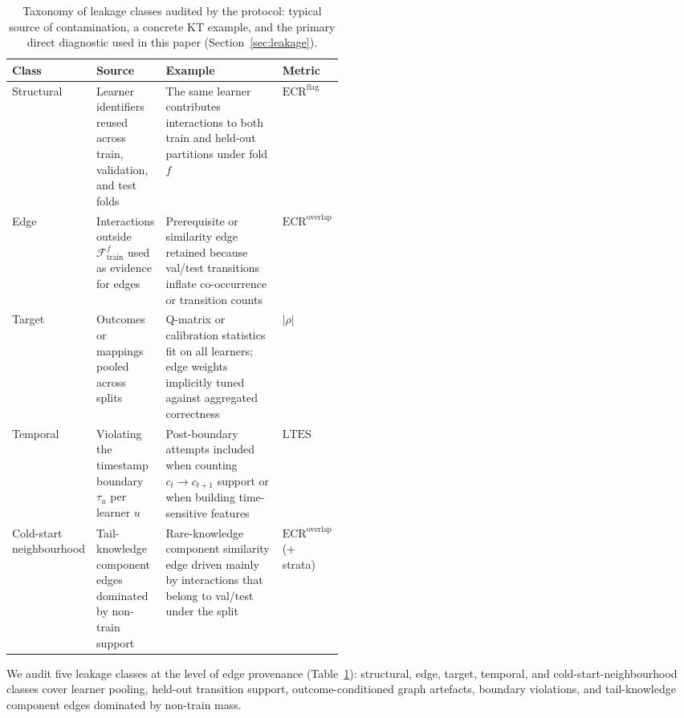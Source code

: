 \documentclass[preprint,10pt,doubleblind]{elsarticle}
\newcommand{\KC}{knowledge component}
\begin{document}
\begin{table}[t]
\centering
\caption{Taxonomy of leakage classes audited by the protocol: typical
source of contamination, a concrete KT example, and the primary
direct diagnostic used in this paper (Section~\ref{sec:leakage}).}
\label{tab:leakage-taxonomy}
\footnotesize
\setlength{\tabcolsep}{3pt}
\begin{tabularx}{\linewidth}{@{} >{\RaggedRight\arraybackslash}p{0.14\linewidth} >{\RaggedRight\arraybackslash}p{0.18\linewidth} >{\RaggedRight\arraybackslash}X >{\RaggedRight\arraybackslash}p{0.16\linewidth} @{}}
\toprule
Class & Source & Example & Metric \\
\midrule
Structural &
Learner identifiers reused across train, validation, and test folds &
The same learner contributes interactions to both train and held-out partitions under fold $f$ &
$\mathrm{ECR}^{\mathrm{flag}}$ \\
Edge &
Interactions outside $\mathcal{F}_{\text{train}}^f$ used as evidence for edges &
Prerequisite or similarity edge retained because val/test transitions inflate co-occurrence or transition counts &
$\mathrm{ECR}^{\mathrm{overlap}}$ \\
Target &
Outcomes or mappings pooled across splits &
Q-matrix or calibration statistics fit on all learners; edge weights implicitly tuned against aggregated correctness &
$|\rho|$ \\
Temporal &
Violating the timestamp boundary $\tau_u$ per learner $u$ &
Post-boundary attempts included when counting $c_t\!\to\!c_{t+1}$ support or when building time-sensitive features &
$\mathrm{LTES}$ \\
Cold-start neighbourhood &
Tail-\KC{} edges dominated by non-train support &
Rare-\KC{} similarity edge driven mainly by interactions that belong to val/test under the split &
$\mathrm{ECR}^{\mathrm{overlap}}$ (+ strata) \\
\bottomrule
\end{tabularx}
\end{table}

We audit five leakage classes at the level of edge provenance
(Table~\ref{tab:leakage-taxonomy}): structural, edge, target, temporal, and
cold-start-neighbourhood classes cover learner pooling, held-out transition
support, outcome-conditioned graph artefacts, boundary violations, and
tail-\KC{} edges dominated by non-train mass.
\end{document}
